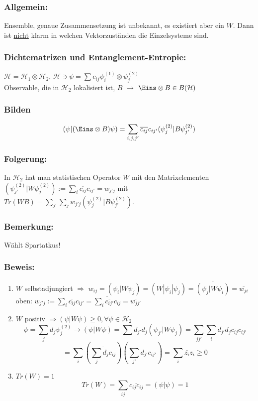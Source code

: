 \documentclass[twoside,a4paper]{scrartcl}
\renewcommand{\1}{\mathds{1}}
\newcommand{\Ra}{\Rightarrow}
\newcommand{\ra}{\rightarrow}
\renewcommand{\H}{\mathcal{H}}
\begin{document}
\subsubsection*{Allgemein:} 
Ensemble, genaue Zusammensetzung ist unbekannt, es existiert aber ein $W$. Dann ist \underline{nicht} klarm in welchen Vektorzuständen die Einzelsysteme sind.

\subsubsection*{Dichtematrizen und Entanglement-Entropie:} 
$\H=\H_1 \otimes \H_2$, $\H \ni \psi=\sum c_{ij} \psi_i^{(1)}\otimes \psi_j^{(2)}$\\
Observable, die in $\H_2$ lokalisiert ist, $B$ $\ra$ $\Eins \otimes B \in B(\H)$
\subsubsection*{Bilden} 
$$(\psi|(\Eins \otimes B)\psi)=\sum_{i,j,j'} \overline{c_{ij}}c_{ij'}(\psi_j^{(2)}|B\psi_{j'}^{(2)})$$
\subsubsection*{Folgerung:} 
In $\H_2$ hat man statistischen Operator $W$ mit den Matrixelementen $(\psi_{j'}^{(2)}|W\psi_{j}^{(2)}):=\sum_i \overline{c_{ij}}c_{ij'}=w_{j'j}$ mit $Tr(WB)=\sum_{j'} \sum_j w_{j'j}(\psi_{j}^{(2)}|B\psi_{j'}^{(2)})$.
\subsubsection*{Bemerkung:} 
Wählt Spartatkus!
\subsubsection*{Beweis:} 
\begin{enumerate}
\item $W$ selbstadjungiert $\Ra$ $w_{ij}=(\psi_i|W\psi_j)=(W|\psi_i|\psi_j)=\overline{(\psi_j|W\psi_i)}= \overline{w_{ji}}$\\
oben: $w_{j'j}:=\sum_i \overline{c_{ij}}c_{ij'}= \overline{\sum_i \overline{c_{ij'}}c_{ij}}=\overline{w_{jj'}}$
\item $W$ positiv $\Ra (\psi|W\psi) \geq 0, \forall \psi \in \H_2$\\
$$\psi=\sum_j d_j \psi_j^{(2)} \ra (\psi|W\psi)=\sum d_{j'}d_j (\psi_{j'}|W\psi_j)=\sum_{jj'} \sum_i \overline{d_{j'}}d_j \overline{c_{ij}}c_{ij'}$$
$$=\sum_i (\overline{\sum_j d_j c_{ij}}) (\sum_{j'} d_{j'}c_{ij'})=\sum_i \overline{z_i}z_i \geq 0$$
\item $Tr(W)=1$\\
$$Tr(W)=\sum_{ij} \overline{c_{ij}c_{ij}}=(\psi|\psi)=1$$
\end{enumerate}
\end{document}
